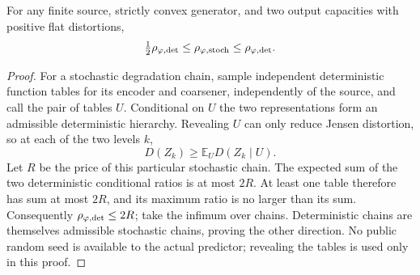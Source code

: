 \begin{lemma}
\label{lem:ext-rounding}
For any finite source, strictly convex generator, and two output capacities
with positive flat distortions,
\[
 \tfrac12\rho_{\varphi,\mathrm{det}}\le\rho_{\varphi,\mathrm{stoch}}
 \le\rho_{\varphi,\mathrm{det}}.
\]
\end{lemma}
\begin{proof}
For a stochastic degradation chain, sample independent deterministic function
tables for its encoder and coarsener, independently of the source, and call
the pair of tables $U$. Conditional on $U$ the two representations form an
admissible deterministic hierarchy. Revealing $U$ can only reduce Jensen
distortion, so at each of the two levels $k$,
\[
 D(Z_k)\ge\mathbb E_U D(Z_k\mid U).
\]
Let $R$ be the price of this particular stochastic chain. The expected sum of
the two deterministic conditional ratios is at most $2R$. At least one table
therefore has sum at most $2R$, and its maximum ratio is no larger than its
sum. Consequently $\rho_{\varphi,\mathrm{det}}\le2R$; take the infimum over chains.
Deterministic chains are themselves admissible stochastic chains, proving the
other direction. No public random seed is available to the actual predictor;
revealing the tables is used only in this proof.
\end{proof}

